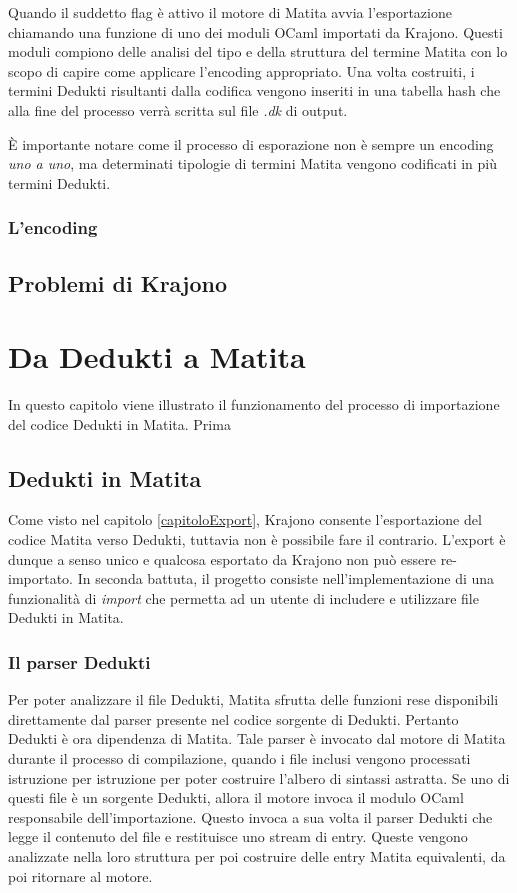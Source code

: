 \documentclass[12pt,a4paper]{report}
\begin{document}
Quando il suddetto flag è attivo il motore di Matita avvia l'esportazione chiamando
una funzione di uno dei moduli OCaml importati da Krajono. Questi moduli compiono
delle analisi del tipo e della struttura del termine Matita con lo scopo di
capire come applicare l'encoding appropriato. Una volta costruiti, i termini
Dedukti risultanti dalla codifica vengono inseriti in una tabella hash
che alla fine del processo verrà scritta sul file \textit{.dk} di output.

È importante notare come il processo di esporazione non è sempre un encoding
\textit{uno a uno}, ma determinati tipologie di termini Matita vengono codificati
in più termini Dedukti.

\subsection{L'encoding}

\section{Problemi di Krajono}


\chapter{Da Dedukti a Matita}
In questo capitolo viene illustrato il funzionamento del processo di importazione
del codice Dedukti in Matita. Prima %


\section{Dedukti in Matita}
Come visto nel capitolo \ref{capitoloExport}, Krajono consente l'esportazione del codice
Matita verso Dedukti, tuttavia non è possibile fare il contrario. L'export è dunque 
a senso unico e qualcosa esportato da Krajono non può essere re-importato. In seconda
battuta, il progetto consiste nell'implementazione di una funzionalità di \textit{import}
che permetta ad un utente di includere e utilizzare file Dedukti in Matita.

\subsection{Il parser Dedukti}\label{sottoSezioneParserDedukti}
Per poter analizzare il file Dedukti, Matita sfrutta delle funzioni rese disponibili
direttamente dal parser presente nel codice sorgente di Dedukti. Pertanto Dedukti è
ora dipendenza di Matita. Tale parser è invocato dal motore di Matita durante il processo
di compilazione, quando i file inclusi vengono processati istruzione per istruzione 
per poter costruire l'albero di sintassi astratta. Se uno di questi file è un sorgente
Dedukti, allora il motore invoca il modulo OCaml responsabile dell'importazione. 
Questo invoca a sua volta il parser Dedukti che legge il contenuto del file e restituisce
uno stream di entry. Queste vengono analizzate nella loro struttura per poi costruire delle
entry Matita equivalenti, da poi ritornare al motore.
\end{document}
